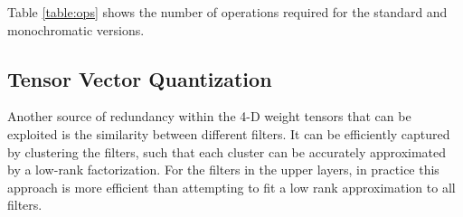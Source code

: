 %
Table \ref{table:ops} shows the number of operations required for the standard and monochromatic versions.

\subsection{Tensor Vector Quantization}\label{subsec:clustering}
Another source of redundancy within the 4-D weight tensors that can be exploited 
is the similarity between different filters. 
It can be efficiently captured by clustering the filters, such that each cluster can
be accurately approximated by a low-rank factorization. For the
filters in the upper layers, in practice this approach is more
efficient than attempting to fit a low rank approximation to all
filters. 

